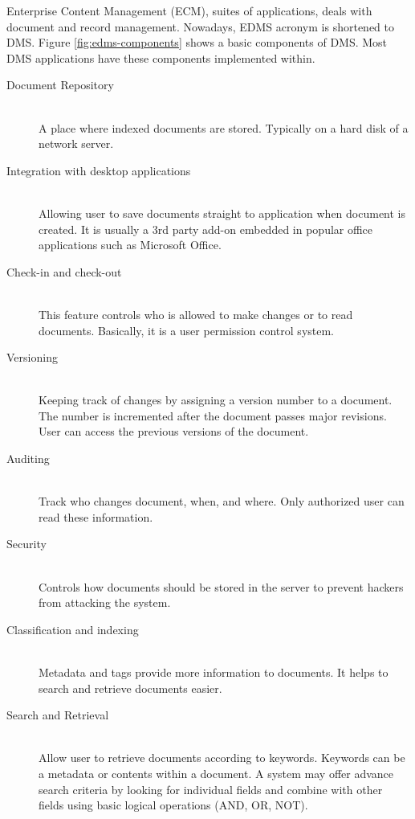 Enterprise Content Management (ECM), suites of applications, deals with document and record management.
Nowadays, EDMS acronym is shortened to DMS.
Figure \ref{fig:edms-components} shows a basic components of DMS.
Most DMS applications have these components implemented within.
\begin{description}
	\item[Document Repository] \hfill \\
	A place where indexed documents are stored.
	Typically on a hard disk of a network server.
	\item[Integration with desktop applications] \hfill \\
	Allowing user to save documents straight to application when document is created.
	It is usually a 3rd party add-on embedded in popular office applications such as Microsoft Office.
	\item[Check-in and check-out] \hfill \\
	This feature controls who is allowed to make changes or to read documents.
	Basically, it is a user permission control system.
	\item[Versioning] \hfill \\
	Keeping track of changes by assigning a version number to a document.
	The number is incremented after the document passes major revisions.
	User can access the previous versions of the document.
	\item[Auditing] \hfill \\
	Track who changes document, when, and where.
	Only authorized user can read these information.
	\item[Security] \hfill \\
	Controls how documents should be stored in the server to prevent hackers from attacking the system.
	\item[Classification and indexing] \hfill \\
	Metadata and tags provide more information to documents.
	It helps to search and retrieve documents easier.
	\item[Search and Retrieval] \hfill \\
	Allow user to retrieve documents according to keywords.
	Keywords can be a metadata or contents within a document.
	A system may offer advance search criteria by looking for individual fields and combine with other fields using basic logical operations (AND, OR, NOT). 
\end{description}

